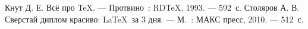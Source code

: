\begin{thebibliography}{99}
	Кнут Д. Е.
	Всё про \TeX.
	\newblock --- Протвино\ : RDTeX, 1993. --- 592~с.
	Столяров А. В.
	Сверстай диплом красиво: \LaTeX\ за 3 дня.
	\newblock --- М.\ : МАКС пресс, 2010. --- 512~с.
\end{thebibliography}

